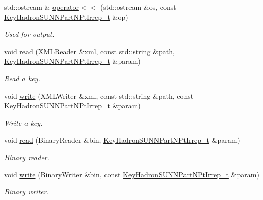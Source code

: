 \begin{DoxyCompactItemize}
\item 
std\+::ostream \& \mbox{\hyperlink{namespacekey__struct_a3ba183723f87a3b999656e0e300430ed}{operator$<$$<$}} (std\+::ostream \&os, const \mbox{\hyperlink{structkey__struct_1_1KeyHadronSUNNPartNPtIrrep__t}{Key\+Hadron\+S\+U\+N\+N\+Part\+N\+Pt\+Irrep\+\_\+t}} \&op)
\begin{DoxyCompactList}\small\item\em Used for output. \end{DoxyCompactList}\item 
void \mbox{\hyperlink{namespacekey__struct_a7ee02ccf72111091675d9639205389d0}{read}} (X\+M\+L\+Reader \&xml, const std\+::string \&path, \mbox{\hyperlink{structkey__struct_1_1KeyHadronSUNNPartNPtIrrep__t}{Key\+Hadron\+S\+U\+N\+N\+Part\+N\+Pt\+Irrep\+\_\+t}} \&param)
\begin{DoxyCompactList}\small\item\em Read a key. \end{DoxyCompactList}\item 
void \mbox{\hyperlink{namespacekey__struct_ac9ae019c63b9f6291b3cf45bfc51d147}{write}} (X\+M\+L\+Writer \&xml, const std\+::string \&path, const \mbox{\hyperlink{structkey__struct_1_1KeyHadronSUNNPartNPtIrrep__t}{Key\+Hadron\+S\+U\+N\+N\+Part\+N\+Pt\+Irrep\+\_\+t}} \&param)
\begin{DoxyCompactList}\small\item\em Write a key. \end{DoxyCompactList}\item 
void \mbox{\hyperlink{namespacekey__struct_af87b39a16fa43d4e3fe23d887e11906e}{read}} (Binary\+Reader \&bin, \mbox{\hyperlink{structkey__struct_1_1KeyHadronSUNNPartNPtIrrep__t}{Key\+Hadron\+S\+U\+N\+N\+Part\+N\+Pt\+Irrep\+\_\+t}} \&param)
\begin{DoxyCompactList}\small\item\em Binary reader. \end{DoxyCompactList}\item 
void \mbox{\hyperlink{namespacekey__struct_af7f6bb4bafd1c1c2477ba7e3d87b65be}{write}} (Binary\+Writer \&bin, const \mbox{\hyperlink{structkey__struct_1_1KeyHadronSUNNPartNPtIrrep__t}{Key\+Hadron\+S\+U\+N\+N\+Part\+N\+Pt\+Irrep\+\_\+t}} \&param)
\begin{DoxyCompactList}\small\item\em Binary writer. \end{DoxyCompactList}\end{DoxyCompactItemize}


